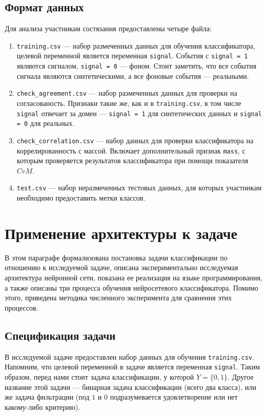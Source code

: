 \documentclass[14pt, a4paper]{extarticle}
\begin{document}
\subsection*{Формат данных}
Для анализа участникам состязания предоставлены четыре файла:
\begin{enumerate}
\item \texttt{training.csv} — набор размеченных данных для обучения классификатора, целевой переменной является переменная \texttt{signal}. События с  \texttt{signal = 1} являются сигналом, \texttt{signal = 0} — фоном. Стоит заметить, что все события сигнала являются синтетическими, а все фоновые события — реальными.
\item \texttt{check\_agreement.csv} — набор размеченных данных для проверки на согласованость. Признаки такие же, как и в \texttt{training.csv}, в том числе \texttt{signal} отвечает за домен — \texttt{signal = 1} для синтетических данных и \texttt{signal = 0} для реальных. 
\item \texttt{check\_correlation.csv} — набор данных для проверки классификатора на коррелированность с массой. Включает дополнительный признак \texttt{mass}, с которым проверяется результатов классификатора при помощи показателя $CvM$.
\item \texttt{test.csv} — набор неразмеченных тестовых данных, для которых участникам необходимо предоставить метки классов.
\end{enumerate}

\section{Применение архитектуры к задаче}
\label{paragraph:architecture}

В этом параграфе формализована постановка задачи классификации по отношению к исследуемой задаче, описана экспериментально исследуемая архитектура нейронной сети, показана ее реализация на языке программирования, а также описаны три процесса обучения нейросетевого классификатора. Помимо этого, приведена методика численного эксперимента для сравнения этих процессов.

\subsection*{Спецификация задачи}

В исследуемой задаче предоставлен набор данных для обучения \texttt{training.csv}. Напомним, что целевой переменной в задаче является переменная \texttt{signal}. Таким образом, перед нами стоит задача классификации, у которой $Y = \{0, 1\}$. Другое название этой задачи — бинарная задача классификации (всего два класса), или же задача фильтрации (под $1$ и $0$ подразумевается удовлетворение или нет какому-либо критерию). 
\end{document}

